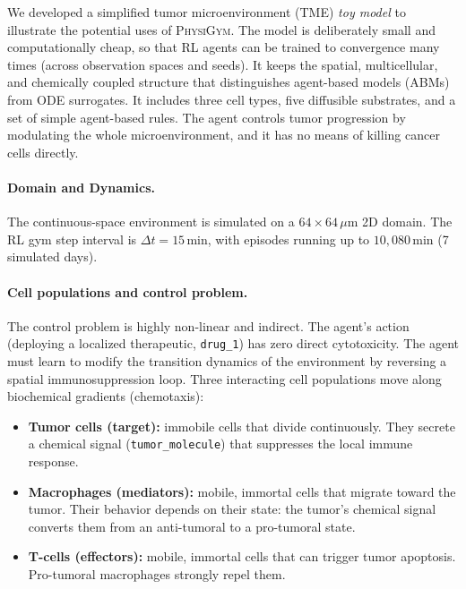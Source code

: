 \documentclass{article}
\newcommand{\physigym}{\textsc{PhysiGym}}
\begin{document}
We developed a simplified tumor microenvironment (TME) \emph{toy model} to
illustrate the potential uses of \physigym{}. The model is deliberately small
and computationally cheap, so that RL agents can be trained to convergence many
times (across observation spaces and seeds). It keeps the spatial,
multicellular, and chemically coupled structure that distinguishes agent-based
models (ABMs) from ODE surrogates. It includes three cell types, five diffusible
substrates, and a set of simple agent-based rules. The agent controls tumor
progression by modulating the whole microenvironment, and it has no means of
killing cancer cells directly.

\paragraph{Domain and Dynamics.}
The continuous-space environment is simulated on a $64 \times 64\,\mu\text{m}$ 2D domain. 
The RL gym step interval is $\Delta t = 15$\,min, with episodes running up to 
$10{,}080$\,min (7 simulated days).

\paragraph{Cell populations and control problem.}
The control problem is highly non-linear and indirect.
The agent's action (deploying a localized therapeutic, \texttt{drug\_1}) has
zero direct cytotoxicity. The agent must learn to modify the transition dynamics
of the environment by reversing a spatial immunosuppression loop. Three
interacting cell populations move along biochemical gradients (chemotaxis):

\begin{itemize}
    \item \textbf{Tumor cells (target):} immobile cells that divide continuously.
    They secrete a chemical signal (\texttt{tumor\_molecule}) that suppresses
    the local immune response.

    \item \textbf{Macrophages (mediators):} mobile, immortal cells that migrate
    toward the tumor. Their behavior depends on their state: the tumor's
    chemical signal converts them from an anti-tumoral to a pro-tumoral state.

    \item \textbf{T-cells (effectors):} mobile, immortal cells that can trigger
    tumor apoptosis. Pro-tumoral macrophages strongly repel them.
\end{itemize}
\end{document}
